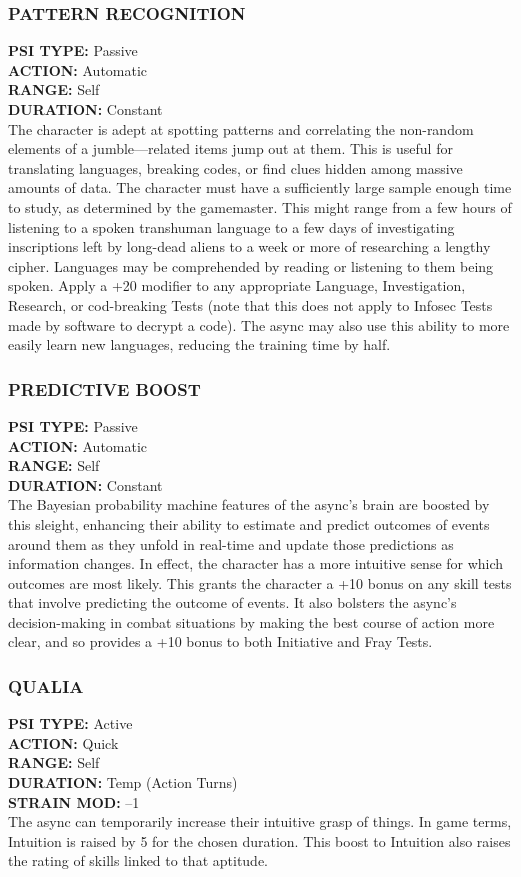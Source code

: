 \subsubsection{PATTERN RECOGNITION} \textbf{PSI TYPE:} Passive \\ \textbf{ACTION:} Automatic \\ \textbf{RANGE:} Self \\ \textbf{DURATION:} Constant \\ The character is adept at spotting patterns and correlating the non-random elements of a jumble—related items jump out at them. This is useful for translating languages, breaking codes, or find clues hidden among massive amounts of data. The character must have a sufficiently large sample enough time to study, as determined by the gamemaster. This might range from a few hours of listening to a spoken transhuman language to a few days of investigating inscriptions left by long-dead aliens to a week or more of researching a lengthy cipher. Languages may be comprehended by reading or listening to them being spoken. Apply a +20 modifier to any appropriate Language, Investigation, Research, or cod-breaking Tests (note that this does not apply to Infosec Tests made by software to decrypt a code). The async may also use this ability to more easily learn new languages, reducing the training time by half. 

\subsubsection{PREDICTIVE BOOST} \textbf{PSI TYPE:} Passive \\ \textbf{ACTION:} Automatic \\ \textbf{RANGE:} Self \\ \textbf{DURATION:} Constant \\ The Bayesian probability machine features of the async’s brain are boosted by this sleight, enhancing their ability to estimate and predict outcomes of events around them as they unfold in real-time and update those predictions as information changes. In effect, the character has a more intuitive sense for which outcomes are most likely. This grants the character a +10 bonus on any skill tests that involve predicting the outcome of events. It also bolsters the async’s decision-making in combat situations by making the best course of action more clear, and so provides a +10 bonus to both Initiative and Fray Tests. 

\subsubsection{QUALIA} \textbf{PSI TYPE:} Active \\ \textbf{ACTION:} Quick \\ \textbf{RANGE:} Self \\ \textbf{DURATION:} Temp (Action Turns) \\ \textbf{STRAIN MOD:} –1 \\ The async can temporarily increase their intuitive grasp of things. In game terms, Intuition is raised by 5 for the chosen duration. This boost to Intuition also raises the rating of skills linked to that aptitude. 

